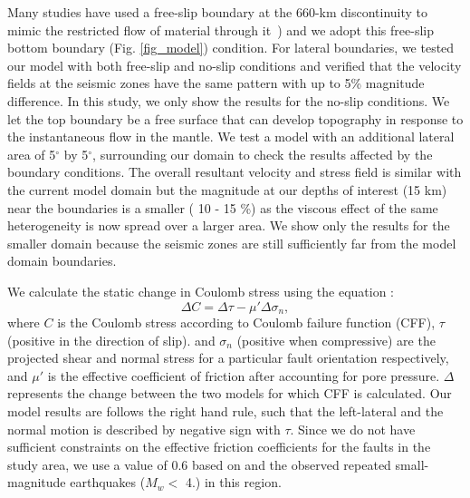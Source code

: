 \documentclass[draft,linenumbers]{agujournal2018}
\begin{document}
Many studies have used a free-slip boundary at the 660-km discontinuity to mimic the restricted flow of material through it~\citep[e.g.,][]{arcay2007slab, billen2007rheologic, quinquis2011role}) and we adopt this free-slip bottom boundary (Fig. \ref{fig_model}) condition. For lateral boundaries, we tested our model with both free-slip and no-slip conditions and verified that the velocity fields at the seismic zones have the same pattern with up to 5\% magnitude difference. In this study, we only show the results for the no-slip conditions. We let the top boundary be a free surface
that can develop topography in response to the instantaneous flow in the mantle. We test a model with an additional lateral area of 5$^{\circ}$ by 5$^{\circ}$, surrounding our domain to check the results affected by the boundary conditions. The overall resultant velocity and stress field is similar with the current model domain but the magnitude at our depths of interest (15 km) near the boundaries is a smaller ( 10 - 15 \%) as the viscous effect of the same heterogeneity is now spread over a larger area. We show only the results for the smaller domain because the seismic zones are still sufficiently far from the model domain boundaries.

We calculate the static change in Coulomb stress using the equation \citep{king1994static}:
\begin{equation}
    \Delta C = \Delta \tau - \mu' \Delta \sigma_n,
\end{equation}
%
where $C$ is the Coulomb stress according to Coulomb failure function (CFF), $\tau$ (positive in the direction of slip). and $\sigma_n$ (positive when compressive) are the projected shear and normal stress for a particular fault orientation respectively, and $\mu'$ is the effective coefficient of friction after accounting for pore pressure. $\Delta$ represents the change between the two models for which CFF is calculated. Our model results are follows the right hand rule, such that the left-lateral and the normal motion is described by negative sign with $\tau$.
Since we do not have sufficient constraints on the effective friction coefficients for the faults in the study area, we use a value of 0.6 based on \citet{hurd2012intraplate} and the observed repeated small-magnitude earthquakes ($M_w <$ 4.) in this region. 
\end{document}
